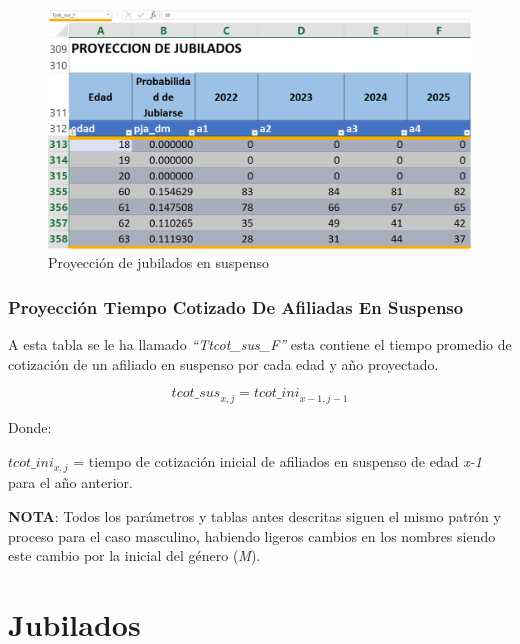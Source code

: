 \documentclass[
  letterpaper,
  DIV=11,
  numbers=noendperiod]{scrreprt}
\begin{document}
\begin{figure}

{\centering \includegraphics{images/F/Img25.png}

}

\caption{Proyección de jubilados en suspenso}

\end{figure}

\hypertarget{proyecciuxf3n-tiempo-cotizado-de-afiliadas-en-suspenso}{%
\subsection{Proyección Tiempo Cotizado De Afiliadas En
Suspenso}\label{proyecciuxf3n-tiempo-cotizado-de-afiliadas-en-suspenso}}

A esta tabla se le ha llamado \emph{``Ttcot\_sus\_F''} esta contiene el
tiempo promedio de cotización de un afiliado en suspenso por cada edad y
año proyectado.

\begin{equation}
{tcot\_sus}_{x,j}={tcot\_ini}_{x-1,j-1}
\end{equation}

Donde:

\({tcot\_ini}_{x,j}\) = tiempo de cotización inicial de afiliados en
suspenso de edad \emph{x-1} para el año anterior.

\textbf{NOTA}: Todos los parámetros y tablas antes descritas siguen el
mismo patrón y proceso para el caso masculino, habiendo ligeros cambios
en los nombres siendo este cambio por la inicial del género (\emph{M}).


\hypertarget{jubilados}{%
\chapter{Jubilados}\label{jubilados}}
\end{document}
